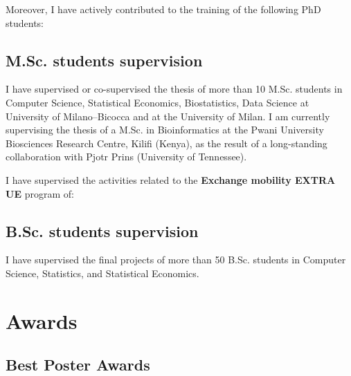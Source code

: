 \documentclass[11pt,a4paper,roman]{moderncv}
\begin{document}
Moreover, I have actively contributed to the training of the following
PhD students:


\subsection{M.Sc. students supervision}

I have supervised or co-supervised the thesis of more than 10 M.Sc.
students  in Computer Science, Statistical Economics, Biostatistics,
Data Science at University of Milano--Bicocca and at the University of Milan.
I am currently supervising the thesis of a M.Sc. in Bioinformatics at the
Pwani University Biosciences Research Centre, Kilifi (Kenya), as the result of a
long-standing collaboration with Pjotr Prins (University of Tennessee).




I have supervised the activities related to the
\textbf{Exchange mobility EXTRA UE} program of:


\subsection{B.Sc. students supervision}

I have supervised the final projects of more than 50 B.Sc. students in
Computer Science, Statistics, and Statistical Economics.

\section{Awards}

\subsection{Best Poster Awards}
\end{document}
